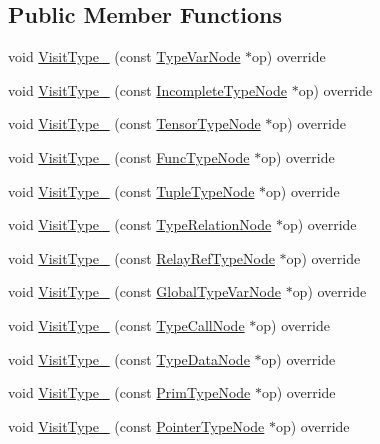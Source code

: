 \subsection*{Public Member Functions}
\begin{DoxyCompactItemize}
\item 
void \hyperlink{classtvm_1_1TypeVisitor_a1e33da035ed09ba49e2cc254f8a033c4}{Visit\+Type\+\_\+} (const \hyperlink{classtvm_1_1TypeVarNode}{Type\+Var\+Node} $\ast$op) override
\item 
void \hyperlink{classtvm_1_1TypeVisitor_ae699be9a6ed94a635c315506e0c2a6d2}{Visit\+Type\+\_\+} (const \hyperlink{classtvm_1_1IncompleteTypeNode}{Incomplete\+Type\+Node} $\ast$op) override
\item 
void \hyperlink{classtvm_1_1TypeVisitor_adb2f5c5f8e3fbe5b62ce8527cd59a30b}{Visit\+Type\+\_\+} (const \hyperlink{classtvm_1_1TensorTypeNode}{Tensor\+Type\+Node} $\ast$op) override
\item 
void \hyperlink{classtvm_1_1TypeVisitor_a063b7b1705ffabb92e58093032686e90}{Visit\+Type\+\_\+} (const \hyperlink{classtvm_1_1FuncTypeNode}{Func\+Type\+Node} $\ast$op) override
\item 
void \hyperlink{classtvm_1_1TypeVisitor_a82c83b1524502579f56d194138badd3e}{Visit\+Type\+\_\+} (const \hyperlink{classtvm_1_1TupleTypeNode}{Tuple\+Type\+Node} $\ast$op) override
\item 
void \hyperlink{classtvm_1_1TypeVisitor_a3ed59cee793514b568fa0e9cb0ca437c}{Visit\+Type\+\_\+} (const \hyperlink{classtvm_1_1TypeRelationNode}{Type\+Relation\+Node} $\ast$op) override
\item 
void \hyperlink{classtvm_1_1TypeVisitor_a11378b4db6f704c04a97bec1c8ea8261}{Visit\+Type\+\_\+} (const \hyperlink{classtvm_1_1RelayRefTypeNode}{Relay\+Ref\+Type\+Node} $\ast$op) override
\item 
void \hyperlink{classtvm_1_1TypeVisitor_af92188034706eec6c1ce5c8240f65cc0}{Visit\+Type\+\_\+} (const \hyperlink{classtvm_1_1GlobalTypeVarNode}{Global\+Type\+Var\+Node} $\ast$op) override
\item 
void \hyperlink{classtvm_1_1TypeVisitor_a8f548b8def48ea4f11a3eafa04d74d96}{Visit\+Type\+\_\+} (const \hyperlink{classtvm_1_1TypeCallNode}{Type\+Call\+Node} $\ast$op) override
\item 
void \hyperlink{classtvm_1_1TypeVisitor_a292b19b578526ea74b1434dc50514a18}{Visit\+Type\+\_\+} (const \hyperlink{classtvm_1_1TypeDataNode}{Type\+Data\+Node} $\ast$op) override
\item 
void \hyperlink{classtvm_1_1TypeVisitor_a2d6a319537d4d3dba04054f3ef8f32f9}{Visit\+Type\+\_\+} (const \hyperlink{classtvm_1_1PrimTypeNode}{Prim\+Type\+Node} $\ast$op) override
\item 
void \hyperlink{classtvm_1_1TypeVisitor_ac8845fbf58c1a1f0ebc23c7ee403aaab}{Visit\+Type\+\_\+} (const \hyperlink{classtvm_1_1PointerTypeNode}{Pointer\+Type\+Node} $\ast$op) override
\end{DoxyCompactItemize}


